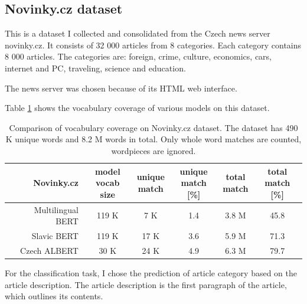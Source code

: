 \documentclass[
  printed, %
  color,   %
  table,   %
  oneside, %
  lof,     %
  lot,     %
]{fithesis3}
\begin{document}
\subsection{Novinky.cz dataset}

This is a dataset I collected and consolidated from the Czech news server novinky.cz. It consists of 32 000 articles from 8 categories. Each category contains 8 000 articles. The categories are: foreign, crime, culture, economics, cars, internet and PC, traveling, science and education.


The news server was chosen because of its HTML web interface.

Table \ref{tab:vocab-nov-compare} shows the vocabulary coverage of various models on this dataset.

\begin{table}[h]
\centering
\small
\begin{tabular}{r|c|c|c|c|c}
        Novinky.cz
        & \rotatebox[origin=l]{90}{\parbox{2.2cm}{model \\ vocab size}} 
        & \rotatebox[origin=l]{90}{\parbox{2cm}{unique \\ match}}
        & \rotatebox[origin=l]{90}{\parbox{2cm}{unique \\ match [\%]}}
        & \rotatebox[origin=l]{90}{\parbox{2cm}{total \\ match}}
        & \rotatebox[origin=l]{90}{\parbox{2cm}{total \\ match [\%]}}
        \\ 
    \toprule
    Multilingual BERT      & 119 K  & 7 K   & 1.4  & 3.8 M   & 45.8 \\
    Slavic BERT            & 119 K  & 17 K  & 3.6  & 5.9 M   & 71.3 \\
    Czech ALBERT           & 30 K   & 24 K  & 4.9  & 6.3 M   & 79.7 \\ 
\end{tabular}
\caption[Vocabulary coverage on Novinky.cz dataset]
{Comparison of vocabulary coverage on Novinky.cz dataset. The dataset has 490 K unique words and 8.2 M words in total. Only whole word matches are counted, wordpieces are ignored.}
\label{tab:vocab-nov-compare}
\end{table} %

For the classification task, I chose the prediction of article category based on the article description. The article description is the first paragraph of the article, which outlines its contents.
\end{document}
